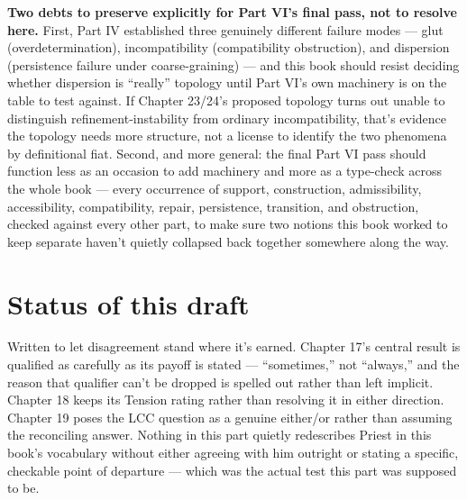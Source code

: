 \textbf{Two debts to preserve explicitly for Part VI's final pass, not to
resolve here.} First, Part IV established three genuinely different
failure modes --- glut (overdetermination), incompatibility (compatibility
obstruction), and dispersion (persistence failure under coarse-graining)
--- and this book should resist deciding whether dispersion is ``really''
topology until Part VI's own machinery is on the table to test against.
If Chapter 23/24's proposed topology turns out unable to distinguish
refinement-instability from ordinary incompatibility, that's evidence the
topology needs more structure, not a license to identify the two
phenomena by definitional fiat. Second, and more general: the final Part
VI pass should function less as an occasion to add machinery and more as
a type-check across the whole book --- every occurrence of support,
construction, admissibility, accessibility, compatibility, repair,
persistence, transition, and obstruction, checked against every other
part, to make sure two notions this book worked to keep separate haven't
quietly collapsed back together somewhere along the way.

\hypertarget{status-of-this-draft}{%
\section{Status of this draft}\label{status-of-this-draft}}

Written to let disagreement stand where it's earned. Chapter 17's central
result is qualified as carefully as its payoff is stated --- ``sometimes,''
not ``always,'' and the reason that qualifier can't be dropped is spelled
out rather than left implicit. Chapter 18 keeps its Tension rating rather
than resolving it in either direction. Chapter 19 poses the LCC question
as a genuine either/or rather than assuming the reconciling answer.
Nothing in this part quietly redescribes Priest in this book's vocabulary
without either agreeing with him outright or stating a specific,
checkable point of departure --- which was the actual test this part was
supposed to be.
